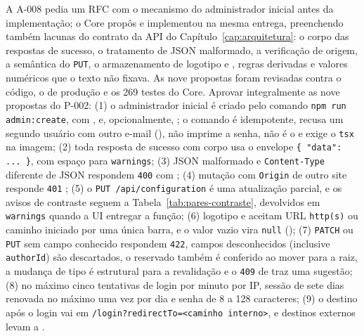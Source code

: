 {A A-008 pedia um RFC com o mecanismo do administrador inicial antes da implementação; o Core propôs e implementou na mesma entrega, preenchendo também lacunas do contrato da API do Capítulo~\ref{cap:arquitetura}: o corpo das respostas de sucesso, o tratamento de JSON malformado, a verificação de origem, a semântica do \texttt{PUT}, o armazenamento de logotipo e , regras derivadas e valores numéricos que o texto não fixava. As nove propostas foram revisadas contra o código, o  de produção e os 269 testes do Core.}
{Aprovar integralmente as nove propostas do P-002: (1) o administrador inicial é criado pelo comando \texttt{npm run admin:create}, com ,  e, opcionalmente, ; o comando é idempotente, recusa um segundo usuário com outro e-mail (), não imprime a senha, não é o  e exige o \texttt{tsx} na imagem; (2) toda resposta de sucesso com corpo usa o envelope \texttt{\{ "data": ... \}}, com espaço para \texttt{warnings}; (3) JSON malformado e \texttt{Content-Type} diferente de JSON respondem \texttt{400} com ; (4) mutação com \texttt{Origin} de outro site responde \texttt{401} ; (5) o \texttt{PUT /api/configuration} é uma atualização parcial, e os avisos de contraste seguem a Tabela~\ref{tab:pares-contraste}, devolvidos em \texttt{warnings} quando a UI entregar a função; (6) logotipo e  aceitam URL \texttt{http(s)} ou caminho iniciado por uma única barra, e o valor vazio vira \texttt{null} (); (7) \texttt{PATCH} ou \texttt{PUT} sem campo conhecido respondem \texttt{422}, campos desconhecidos (inclusive \texttt{authorId}) são descartados, o  reservado também é conferido ao mover para a raiz, a mudança de tipo é estrutural para a revalidação e o \texttt{409} de  traz uma sugestão; (8) no máximo cinco tentativas de login por minuto por IP, sessão de sete dias renovada no máximo uma vez por dia e senha de 8 a 128 caracteres; (9) o destino após o login vai em \texttt{/login?redirectTo=<caminho interno>}, e destinos externos levam a .}
